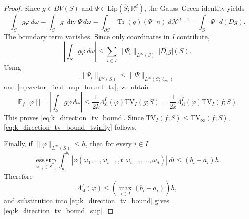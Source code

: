 \documentclass[10pt,a4paper]{amsart}
\newcommand{\TV}{\mathrm{TV}}
\begin{document}
\begin{proof}
Since $g\in BV(S)$ and $\Psi\in\mathrm{Lip}(\overline S;\mathbb R^d)$, the
Gauss--Green identity yields
$$
\int_S g\varphi\,d\omega
=
\int_S g\,\operatorname{div}\Psi\,d\omega
=
\int_{\partial S}\operatorname{Tr}(g)(\Psi\cdot n)\,d\mathcal H^{d-1}
-
\int_S\Psi\cdot d(Dg).
$$
The boundary term vanishes. Since only coordinates in $I$ contribute,
$$
\left|\int_S g\varphi\,d\omega\right|
\le
\sum_{i\in I}\|\Psi_i\|_{L^\infty(S)}\,|D_i g|(S).
$$
Using
$$
\|\Psi_i\|_{L^\infty(S)}
\le
\|\Psi\|_{L^\infty(S;\ell_\infty)}
$$
and \eqref{eq:vector_field_sup_bound_tv}, we obtain
$$
|\mathbb E_f[\varphi]|
=
\left|\int_S g\varphi\,d\omega\right|
\le
\frac{1}{2k}
\Lambda_{\mathrm{sl}}^I(\varphi)
\TV_I(g;S)
=
\frac{1}{2k}
\Lambda_{\mathrm{sl}}^I(\varphi)
\TV_I(f;S).
$$
This proves \eqref{eq:k_direction_tv_bound}. Since
$\TV_I(f;S)\le \TV_\infty(f;S)$, \eqref{eq:k_direction_tv_bound_tvinfty}
follows.

Finally, if $\|\varphi\|_{L^\infty(S)}\le h$, then for every $i\in I$,
$$
\operatorname*{ess\,sup}_{\omega_{-i}\in S_{-i}}
\int_{a_i}^{b_i}
|\varphi(\omega_1,\ldots,\omega_{i-1},t,\omega_{i+1},\ldots,\omega_d)|\,dt
\le
(b_i-a_i)h.
$$
Therefore
$$
\Lambda_{\mathrm{sl}}^I(\varphi)
\le
\left(\max_{i\in I}(b_i-a_i)\right)h,
$$
and substitution into \eqref{eq:k_direction_tv_bound} gives
\eqref{eq:k_direction_tv_bound_sup}.
\end{proof}
\end{document}
